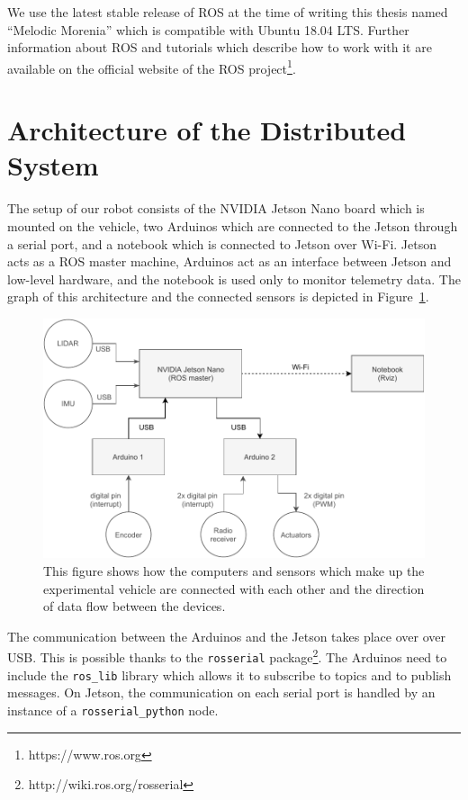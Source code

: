 We use the latest stable release of \gls*{ROS} at the time of writing this thesis named ``Melodic Morenia'' which is compatible with Ubuntu 18.04 LTS. Further information about \gls*{ROS} and tutorials which describe how to work with it are available on the official website of the \gls*{ROS} project\footnote{https://www.ros.org}.

\section{Architecture of the Distributed System}

The setup of our robot consists of the NVIDIA Jetson Nano board which is mounted on the vehicle, two Arduinos which are connected to the Jetson through a serial port, and a notebook which is connected to Jetson over Wi-Fi. Jetson acts as a \gls*{ROS} master machine, Arduinos act as an interface between Jetson and low-level hardware, and the notebook is used only to monitor telemetry data. The graph of this architecture and the connected sensors is depicted in Figure~\ref{fig:ros_diagram}.

\begin{figure}
	\centering
	\includegraphics[width=125mm]{../img/ros_diagram}
	\caption{This figure shows how the computers and sensors which make up the experimental vehicle are connected with each other and the direction of data flow between the devices.}
	\label{fig:ros_diagram}
\end{figure}

The communication between the Arduinos and the Jetson takes place over over USB. This is possible thanks to the \verb|rosserial| package\footnote{http://wiki.ros.org/rosserial}. The Arduinos need to include the \verb|ros_lib| library which allows it to subscribe to topics and to publish messages. On Jetson, the communication on each serial port is handled by an instance of a \verb|rosserial_python| node.

